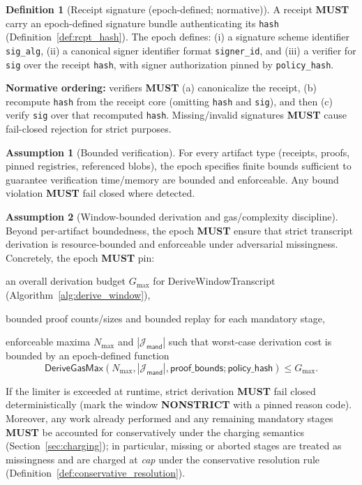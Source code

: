 \documentclass[11pt]{article}
\newcommand{\MUST}{\textbf{MUST}}
\newcommand{\code}[1]{\texttt{#1}}
\newcommand{\1}{\mathbf{1}}
\theoremstyle{definition}
\newtheorem{definition}{Definition}
\newtheorem{assumption}{Assumption}
\theoremstyle{plain}
\begin{document}
\begin{definition}[Receipt signature (epoch-defined; normative)]
\label{def:sig}
A receipt \MUST{} carry an epoch-defined signature bundle authenticating its \code{hash} (Definition~\ref{def:rcpt_hash}). The epoch defines:
(i) a signature scheme identifier \code{sig\_alg}, (ii) a canonical signer identifier format \code{signer\_id}, and (iii) a verifier for \code{sig} over the receipt \code{hash}, with signer authorization pinned by \code{policy\_hash}.

\textbf{Normative ordering:} verifiers \MUST{} (a) canonicalize the receipt, (b) recompute \code{hash} from the receipt core (omitting \code{hash} and \code{sig}), and then (c) verify \code{sig} over that recomputed \code{hash}. Missing/invalid signatures \MUST{} cause fail-closed rejection for strict purposes.
\end{definition}

\begin{assumption}[Bounded verification]
\label{ass:bounded_verif}
For every artifact type (receipts, proofs, pinned registries, referenced blobs), the epoch specifies finite bounds sufficient to guarantee verification time/memory are bounded and enforceable. Any bound violation \MUST{} fail closed where detected.
\end{assumption}

\begin{assumption}[Window-bounded derivation and gas/complexity discipline]
\label{ass:window_gas}
Beyond per-artifact boundedness, the epoch \MUST{} ensure that strict transcript derivation is resource-bounded and enforceable under adversarial missingness.
Concretely, the epoch \MUST{} pin:
\begin{tightitemize}
\item an overall derivation budget $G_{\max}$ for \textsf{DeriveWindowTranscript} (Algorithm~\ref{alg:derive_window}),
\item bounded proof counts/sizes and bounded replay for each mandatory stage,
\item enforceable maxima $N_{\max}$ and $|\mathcal{J}_{\textsf{mand}}|$ such that worst-case derivation cost is bounded by an epoch-defined function
\[
\mathsf{DeriveGasMax}(N_{\max},|\mathcal{J}_{\textsf{mand}}|,\textsf{proof\_bounds};\textsf{policy\_hash})\le G_{\max}.
\]
\end{tightitemize}
If the limiter is exceeded at runtime, strict derivation \MUST{} fail closed deterministically (mark the window \textbf{NONSTRICT} with a pinned reason code).
Moreover, any work already performed and any remaining mandatory stages \MUST{} be accounted for conservatively under the charging semantics (Section~\ref{sec:charging}); in particular, missing or aborted stages are treated as missingness and are charged at \emph{cap} under the conservative resolution rule (Definition~\ref{def:conservative_resolution}).
\end{assumption}
\end{document}
